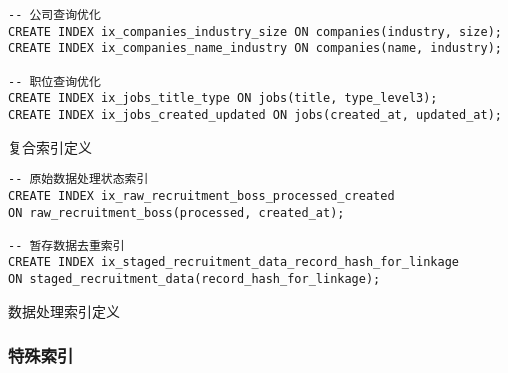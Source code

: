 \begin{listing}[htbp]
  \begin{verbatim}
-- 公司查询优化
CREATE INDEX ix_companies_industry_size ON companies(industry, size);
CREATE INDEX ix_companies_name_industry ON companies(name, industry);

-- 职位查询优化
CREATE INDEX ix_jobs_title_type ON jobs(title, type_level3);
CREATE INDEX ix_jobs_created_updated ON jobs(created_at, updated_at);
  \end{verbatim}
  \caption{复合索引定义}\label{lst:composite_indexes}
\end{listing}

\begin{listing}[htbp]
  \begin{verbatim}
-- 原始数据处理状态索引
CREATE INDEX ix_raw_recruitment_boss_processed_created 
ON raw_recruitment_boss(processed, created_at);

-- 暂存数据去重索引
CREATE INDEX ix_staged_recruitment_data_record_hash_for_linkage 
ON staged_recruitment_data(record_hash_for_linkage);
  \end{verbatim}
  \caption{数据处理索引定义}\label{lst:processing_indexes}
\end{listing}

\subsubsection{特殊索引}

